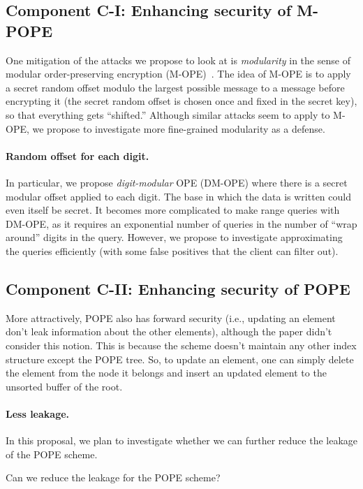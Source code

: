 

\subsection{Component C-I:  Enhancing security of M-POPE}
One mitigation of the attacks we propose to look at is \emph{modularity} in the
sense of modular order-preserving encryption (M-OPE)~\cite{C:BolCheOne11}.  The
idea of M-OPE is to apply a secret random offset modulo the largest possible
message to a message before encrypting it (the secret random offset is chosen
once and fixed in the secret key), so that everything gets ``shifted.''
Although similar attacks seem to apply to M-OPE, we propose to investigate more
fine-grained modularity as a defense. 

\paragraph{Random offset for each digit.}
In particular, we propose \emph{digit-modular} OPE (DM-OPE) where there is a
secret modular offset applied to each digit.  The base in which the data is
written could even itself be secret.  It becomes more complicated to make range
queries with DM-OPE, as it requires an exponential number of queries in the
number of ``wrap around'' digits in the query.  However, we propose to
investigate approximating the queries efficiently (with some false positives
that the client can filter out).


\subsection{Component C-II:  Enhancing security of POPE}

More attractively, POPE also has forward security (i.e., updating an element
don't leak information about the other elements), although the paper didn't
consider this notion. This is because the scheme doesn't maintain any other
index structure except the POPE tree. So, to update an element, one can simply
delete the element from the node it belongs and insert an updated element to
the unsorted buffer of the root. 

\paragraph{Less leakage.}
In this proposal, we plan to investigate whether we can further reduce the
leakage of the POPE scheme. 

\begin{question}
Can we reduce the leakage for the POPE scheme?
\end{question}

